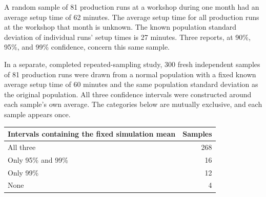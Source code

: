 \noindent\begin{minipage}[t]{0.60\linewidth}
\vspace{0pt}
A random sample of 81 production runs at a workshop during one month had an average setup time of 62 minutes. The average setup time for all production runs at the workshop that month is unknown. The known population standard deviation of individual runs' setup times is 27 minutes. Three reports, at 90\%, 95\%, and 99\% confidence, concern this same sample.

In a separate, completed repeated-sampling study, 300 fresh independent samples of 81 production runs were drawn from a normal population with a fixed known average setup time of 60 minutes and the same population standard deviation as the original population. All three confidence intervals were constructed around each sample's own average. The categories below are mutually exclusive, and each sample appears once.
\end{minipage}\hfill
\begin{minipage}[t]{0.38\linewidth}
\vspace{0pt}
\centering
\small
\setlength{\tabcolsep}{4pt}
\begin{tabularx}{\linewidth}{@{}>{\raggedright\arraybackslash}Xr@{}}\toprule
Intervals containing the fixed simulation mean & Samples\\\midrule
All three & 268\\
Only 95\% and 99\% & 16\\
Only 99\% & 12\\
None & 4\\
\bottomrule\end{tabularx}
\end{minipage}\par


